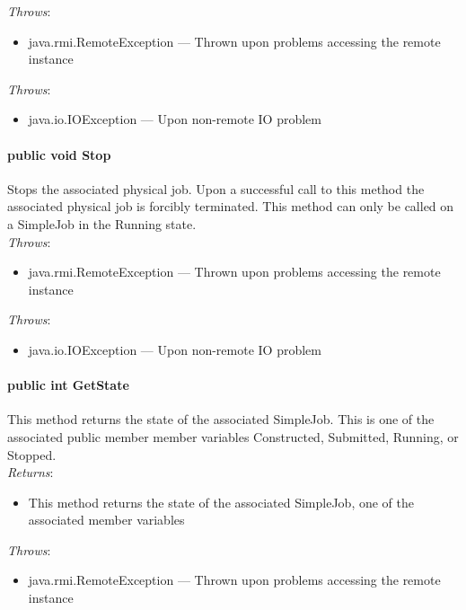 \documentclass[$Date: 2003/06/26 19:29:31 $]{glabarticle}
\begin{document}
 \textit{Throws}:
 \begin{itemize}
 \item[] java.rmi.RemoteException --- Thrown upon problems accessing the remote instance
 \end{itemize}
 
\textit{Throws}:
\begin{itemize}
\item[] java.io.IOException --- Upon non-remote IO problem 
\end{itemize}

\paragraph{public void Stop}

Stops the associated physical job. Upon a successful call to this
method the associated physical job is forcibly terminated. This method
can only be called on a SimpleJob in the Running state. \\

 \textit{Throws}:
 \begin{itemize}
 \item[] java.rmi.RemoteException --- Thrown upon problems accessing the remote instance 
 \end{itemize}
 
\textit{Throws}:
\begin{itemize}
\item[] java.io.IOException --- Upon non-remote IO problem 
\end{itemize}

\paragraph{public int GetState}

This method returns the state of the associated SimpleJob. This is one
of the associated public member member variables Constructed,
Submitted, Running, or Stopped. \\

 \textit{Returns}:
 \begin{itemize}
 \item[] This method returns the state of the associated SimpleJob, one of the associated member variables
 \end{itemize} 

 \textit{Throws}:
 \begin{itemize}
 \item[] java.rmi.RemoteException --- Thrown upon problems accessing the remote instance 
 \end{itemize}
 
\end{document}
